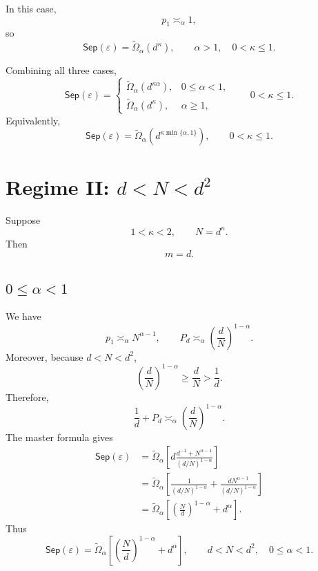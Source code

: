 \documentclass[11pt]{article}
\newcommand{\Sep}{\mathsf{Sep}}
\newcommand{\eps}{\varepsilon}
\begin{document}
In this case,
\[
p_1\asymp_\alpha1,
\]
so
\begin{equation}
\boxed{
\Sep(\eps) = \widetilde\Omega_\alpha(d^\kappa),
\qquad
\alpha>1,\quad 0<\kappa\le1.
}
\label{eq:sep-smallN-alpha-greater1}
\end{equation}

Combining all three cases,
\begin{equation}
\boxed{
\Sep(\eps) =
\begin{cases}
\widetilde\Omega_\alpha(d^{\kappa\alpha}), &0\le\alpha<1,\\[1mm]
\widetilde\Omega_\alpha(d^\kappa), &\alpha\ge1,
\end{cases}
\qquad
0<\kappa\le1.
}
\label{eq:sep-kappa-small-final}
\end{equation}
Equivalently,
\[
\Sep(\eps) = \widetilde\Omega_\alpha\left( d^{\kappa\min\{\alpha,1\}} \right), \qquad 0<\kappa\le1.
\]

\section{Regime II: \texorpdfstring{$d<N<d^2$}{d less than N less than d squared}}

Suppose
\[
1<\kappa<2, \qquad N=d^\kappa.
\]
Then
\[
m=d.
\]

\subsection{\texorpdfstring{$0\le\alpha<1$}{alpha less than one}}

We have
\[
p_1\asymp_\alpha N^{\alpha-1}, \qquad P_d \asymp_\alpha \left(\frac dN\right)^{1-\alpha}.
\]
Moreover, because $d<N<d^2$,
\[
\left(\frac dN\right)^{1-\alpha} \ge \frac dN > \frac1d.
\]
Therefore,
\[
\frac1d+P_d \asymp_\alpha \left(\frac dN\right)^{1-\alpha}.
\]
The master formula gives
\begin{align}
\Sep(\eps)
&= \widetilde\Omega_\alpha\left[ d \frac{d^{-1}+N^{\alpha-1}} {(d/N)^{1-\alpha}} \right] \nonumber \\
&= \widetilde\Omega_\alpha\left[ \frac{1}{(d/N)^{1-\alpha}} + \frac{dN^{\alpha-1}} {(d/N)^{1-\alpha}} \right] \nonumber \\
&= \widetilde\Omega_\alpha\left[ \left(\frac Nd\right)^{1-\alpha} +d^\alpha \right].
\label{eq:largeN-alpha-less1-Nd}
\end{align}
Thus
\begin{equation}
\boxed{
\Sep(\eps) = \widetilde\Omega_\alpha\left[ \left(\frac Nd\right)^{1-\alpha} +d^\alpha \right], \qquad d<N<d^2,\quad 0\le\alpha<1.
}
\label{eq:largeN-alpha-less1}
\end{equation}
\end{document}
